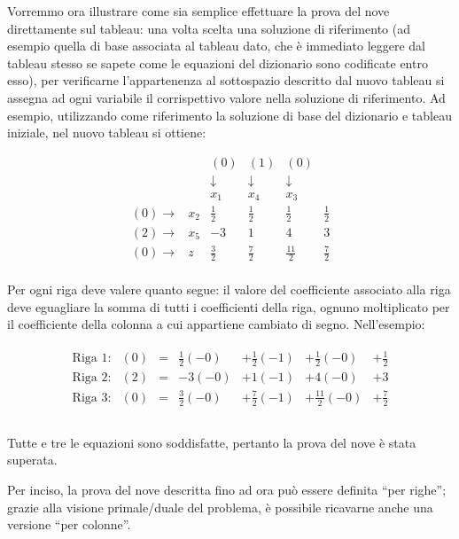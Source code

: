 \documentclass{article}
\begin{document}
  	Vorremmo ora illustrare come sia semplice effettuare la prova del nove direttamente sul tableau: una volta scelta una soluzione di riferimento (ad esempio quella di base associata al tableau dato, che \`e immediato leggere dal tableau stesso se sapete come le equazioni del dizionario sono codificate entro esso), per verificarne l'appartenenza al sottospazio descritto dal nuovo tableau si assegna ad ogni variabile il corrispettivo valore nella soluzione di riferimento. Ad esempio, utilizzando come riferimento la soluzione di base del dizionario e tableau iniziale, nel nuovo tableau si ottiene:
  	
  	\[
  	\begin{array}{rrrrrr}
  	&  & (0)  & (1) & (0) \\
  	&  & \downarrow \;& \downarrow \;& \downarrow \;\\
  	&  & x_1  & x_4 & x_3  \\
  	(0) \rightarrow & x_2 &  \frac{1}{2} &  \frac{1}{2}  & \frac{1}{2}  &  \frac{1}{2} \\
  	(2) \rightarrow &   x_5 &  -3 &  1  &  4  &  3 \\
  	(0) \rightarrow & z  & \frac{3}{2} & \frac{7}{2} & \frac{11}{2}  & \frac{7}{2} \\
  	\end{array}
  	\]
  	
  	Per ogni riga deve valere quanto segue: il valore del coefficiente associato alla riga deve eguagliare la somma di tutti i coefficienti della riga, ognuno moltiplicato per il coefficiente della colonna a cui appartiene cambiato di segno. Nell'esempio:
  	
	\[
	\begin{array}{c}
	\begin{array}{llcrrrr}
	\text{Riga 1:} & (0) &=& \frac{1}{2}(-0) & +\frac{1}{2}(-1) & +\frac{1}{2}(-0) & +\frac{1}{2} \\
	\text{Riga 2:} & (2) &=& -3(-0) & +1(-1) & +4(-0) & +3 \\
	\text{Riga 3:} & (0)    &=& \frac{3}{2}(-0) & +\frac{7}{2}(-1) & +\frac{11}{2}(-0) & +\frac{7}{2} \\
	\end{array}\\		
	\end{array}
	\]  	
	
  	Tutte e tre le equazioni sono soddisfatte, pertanto la prova del nove è stata superata.
  	
  	Per inciso, la prova del nove descritta fino ad ora può essere definita ``per righe''; grazie alla visione primale/duale del problema, è possibile ricavarne anche una versione ``per colonne''.
  	
\end{document}
